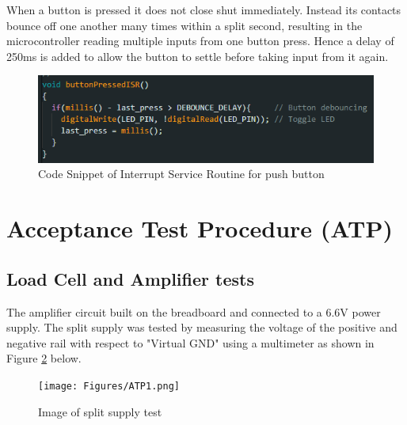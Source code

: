 \documentclass[class=report,11pt,crop=false]{standalone}
\begin{document}
	When a button is pressed it does not close shut immediately. Instead its contacts bounce off one another many times within a split second, resulting in the microcontroller reading multiple inputs from one button press. Hence a delay of 250ms is added to allow the button to settle before taking input from it again.  
	\begin{figure}[h!]
		\centering
		\includegraphics[width=0.7\linewidth]{Figures/ButtonPressed.png}
		\caption{Code Snippet of Interrupt Service Routine for push button}
		\label{fig:S16}
	\end{figure}
	
	\section{Acceptance Test Procedure (ATP)}
	\subsection{Load Cell and Amplifier tests}
	The amplifier circuit built on the breadboard and connected to a 6.6V power supply. The split supply was tested by measuring the voltage of the positive and negative rail with respect to "Virtual GND" using a multimeter as shown in Figure \ref{fig:S7} below.
	\begin{figure}[h!]
		\centering
		\texttt{[image: Figures/ATP1.png]}
		\caption{Image of split supply test}
		\label{fig:S7}
	\end{figure}
	
\end{document}
